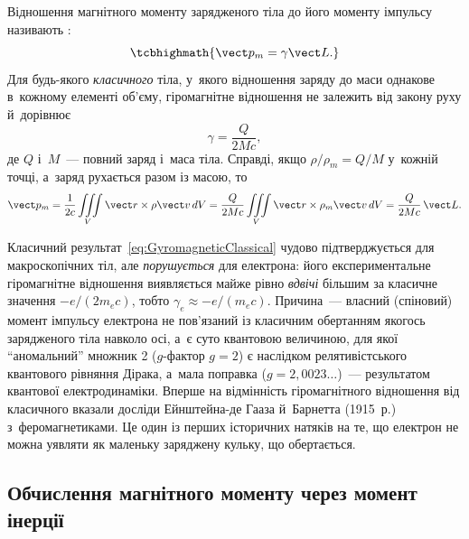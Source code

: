 Відношення магнітного моменту зарядженого тіла до його моменту імпульсу називають
:
\begin{equation*}
	\tcbhighmath{
		\vect p_m = \gamma\vect L.
	}
\end{equation*}
Для будь-якого \emph{класичного} тіла, у~якого відношення заряду до маси однакове
в~кожному елементі об'єму, гіромагнітне відношення не залежить від закону руху й~дорівнює
\begin{equation}\label{eq:GyromagneticClassical}
	\gamma = \frac{Q}{2Mc},
\end{equation}
де $Q$ і~$M$~--- повний заряд і~маса тіла. Справді, якщо $\rho/\rho_m = Q/M$ у~кожній
точці, а~заряд рухається разом із масою, то
\begin{equation*}
	\vect p_m = \frac1{2c}\iiint\limits_V \vect r\times\rho\vect v\, dV = \frac{Q}{2Mc}\iiint\limits_V \vect r\times\rho_m\vect v\, dV = \frac{Q}{2Mc}\,\vect L.
\end{equation*}

\begin{Historical}
	Класичний результат~\eqref{eq:GyromagneticClassical} чудово підтверджується для
	макроскопічних тіл, але \emph{порушується} для електрона: його експериментальне
	гіромагнітне відношення виявляється майже рівно \emph{вдвічі} більшим за класичне
	значення $-e/(2m_ec)$, тобто $\gamma_e \approx -e/(m_ec)$. Причина~--- власний
	(спіновий) момент імпульсу електрона не пов'язаний із класичним обертанням якогось
	зарядженого тіла навколо осі, а~є суто квантовою величиною, для якої
	\enquote{аномальний} множник 2 ($g$-фактор $g=2$) є наслідком релятивістського
	квантового рівняння Дірака, а~мала поправка ($g = 2{,}0023\ldots$)~--- результатом
	квантової електродинаміки. Вперше на відмінність гіромагнітного відношення від
	класичного вказали досліди Ейнштейна-де Гааза й~Барнетта (1915~р.) з~феромагнетиками.
	Це один із перших історичних натяків на те, що електрон не можна уявляти як маленьку
	заряджену кульку, що обертається.
\end{Historical}


\subsection*{Обчислення магнітного моменту через момент інерції}


